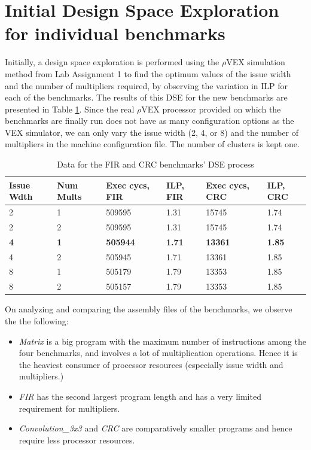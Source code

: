 \documentclass[conference]{IEEEtran}
\begin{document}
\section{Initial Design Space Exploration for individual benchmarks}
Initially, a design space exploration is performed using the $\rho$VEX simulation method from Lab Assignment 1 to find the optimum values of the issue width and the number of multipliers required, by observing the variation in ILP for each of the benchmarks. The results of this DSE for the new benchmarks are presented in Table \ref{table:dse}. Since the real $\rho$VEX processor provided on which the benchmarks are finally run does not have as many configuration options as the VEX simulator, we can only vary the issue width (2, 4, or 8) and the number of multipliers in the machine configuration file. The number of clusters is kept one.

\begin{centering}
	\begin{table}
	\centering
	\caption{Data for the FIR and CRC benchmarks' DSE process}
	\begin{tabular}{ | p{0.6cm} | p{0.7cm} | p{1cm} | p{0.7cm} | p{1cm} |p{0.8cm}|}
		\hline
		Issue Wdth	& Num Mults & Exec cycs, FIR &ILP, FIR &	Exec cycs, CRC &	ILP, CRC \\ \hline
		2	& 1 &509595 &1.31 &	15745 &	1.74 \\ 
		2	&2	&509595	&1.31 & 15745 & 1.74 \\
		\textbf{4}	&\textbf{1}	&\textbf{505944}	&\textbf{1.71}	&\textbf{13361}	&\textbf{1.85} \\
		4	&2	&505945	&1.71	&13361	&1.85 \\
		8	&1	&505179	&1.79	&13353	&1.85 \\
		8	&2	&505157	&1.79	&13353	&1.85 \\
		\hline
	\end{tabular}
	\label{table:dse}
\end{table}
\end{centering}

On analyzing and comparing the assembly files of the benchmarks, we observe the the following:
\begin{itemize}
    \item \textit{Matrix} is a big program with the maximum number of instructions among the four benchmarks, and involves a lot of multiplication operations. Hence it is the heaviest consumer of processor resources (especially issue width and multipliers.)
    \item \textit{FIR} has the second largest program length and has a very limited requirement for multipliers.
    \item \textit{Convolution\_3x3} and \textit{CRC} are comparatively smaller programs and hence require less processor resources.
\end{itemize}
\end{document}
